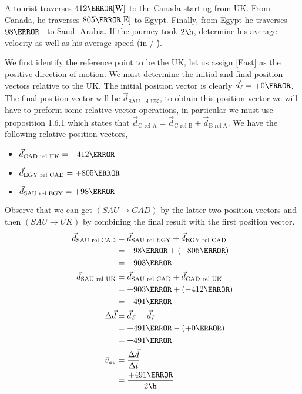 \documentclass[12pt]{article} %
\newcommand{\tx}[1]{\text{#1}}
\begin{document}
\begin{qstn}[3]
    A tourist traverses $412\km[\tx{W}]$ to the Canada starting from UK. From Canada, he traverses $805\km[\tx{E}]$ to Egypt. Finally, from Egypt he traverses $98\km$[\tx{E}] to Saudi Arabia. If the journey took $2 \h$, determine his average velocity as well as his average speed (in \km / \h). 
    \begin{soln}
        We first identify the reference point to be the UK, let us assign [East] as the positive direction of motion. We must determine the initial and final position vectors relative to the UK. The initial position vector is clearly $\vec d_I = +0\m$. The final position vector will be $\vec d_{\tx{SAU rel UK}}$, to obtain this position vector we will have to preform some relative vector operations, in particular we must use proposition 1.6.1 which states that $\vec d_{\tx{C rel A}} = \vec d_{\tx{C rel B}} + \vec d_{\tx{B rel A}}$. We have the following relative position vectors,
        \begin{itemize}
            \item $\vec d_{\tx{CAD rel UK}} = -412\km$
            \item $\vec d_{\tx{EGY rel CAD}} = +805 \km$
            \item $\vec d_{\tx{SAU rel EGY}} = +98\km$
        \end{itemize}
        Observe that we can get $(SAU \rightarrow CAD)$ by the latter two position vectors and then $(SAU \rightarrow UK)$ by combining the final result with the first position vector.
        \begin{align*}
            \vec d_{\tx{SAU rel CAD}} &= \vec d_{\tx{SAU rel EGY}} + \vec d_{\tx{EGY rel CAD}}\\
            &= +98\km + (+805\km)\\
            &= +903\km\\
            \vec d_{\tx{SAU rel UK}} &= \vec d_{\tx{SAU rel CAD}} + \vec d_{\tx{CAD rel UK}}\\
            &= +903\km + (-412\km)\\
            &= +491\km\\
            \Delta \vec d &= \vec d_F - \vec d_I\\
            &= +491\km - (+0\km)\\
            &= +491\km\\
            \vec v_{av} &= \frac{\Delta \vec d}{\Delta t}\\
            &= \frac{+491\km}{2\h}\\

\end{align*}
\end{soln}
\end{qstn}
\end{document}
